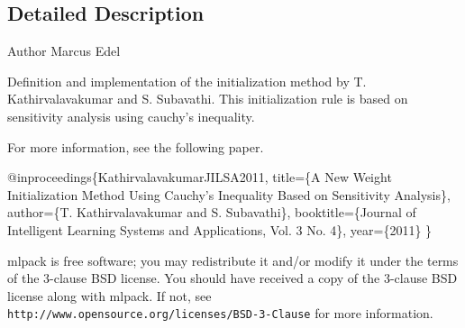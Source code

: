 \subsection{Detailed Description}
\begin{DoxyAuthor}{Author}
Marcus Edel
\end{DoxyAuthor}
Definition and implementation of the initialization method by T. Kathirvalavakumar and S. Subavathi. This initialization rule is based on sensitivity analysis using cauchy’s inequality.

For more information, see the following paper.


\begin{DoxyCode}
@inproceedings\{KathirvalavakumarJILSA2011,
  title=\{A New Weight Initialization Method Using Cauchy’s Inequality Based
  on Sensitivity Analysis\},
  author=\{T. Kathirvalavakumar and S. Subavathi\},
  booktitle=\{Journal of Intelligent Learning Systems and Applications,
  Vol. 3 No. 4\},
  year=\{2011\}
\}
\end{DoxyCode}


mlpack is free software; you may redistribute it and/or modify it under the terms of the 3-\/clause B\+SD license. You should have received a copy of the 3-\/clause B\+SD license along with mlpack. If not, see {\tt http\+://www.\+opensource.\+org/licenses/\+B\+S\+D-\/3-\/\+Clause} for more information. 